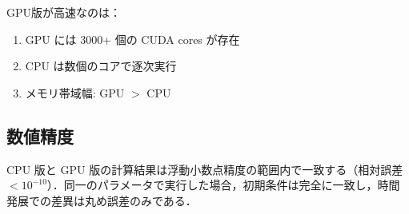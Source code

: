 GPU版が高速なのは：

\begin{enumerate}
  \item GPU には 3000+ 個の CUDA cores が存在
  \item CPU は数個のコアで逐次実行
  \item メモリ帯域幅: GPU $>$ CPU
\end{enumerate}

\subsection{数値精度}

CPU 版と GPU 版の計算結果は浮動小数点精度の範囲内で一致する（相対誤差 $< 10^{-10}$）．同一のパラメータで実行した場合，初期条件は完全に一致し，時間発展での差異は丸め誤差のみである．
